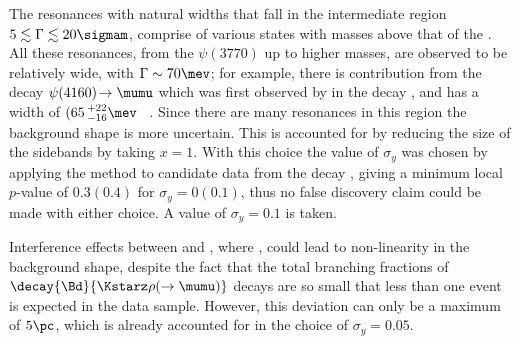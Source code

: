 The resonances with natural widths that fall in the intermediate region
$5\lesssim\Gamma\lesssim20\sigmam$, comprise of various \ccbar states with masses above that of the
\psitwos.
All these resonances, from the $\psi(3770)$ up to higher masses, are observed to be relatively
wide, with $\Gamma\sim 70\mev$; for
example, there is contribution from the decay $\psi(4160)\!\to\mumu$ which was first observed by
\lhcb in the decay \decay{\Bp}{\Kp\mumu},
and has a width of $(65\,^{+22}_{-16}\mev$~\cite{LHCb-PAPER-2013-039} .
Since there are many resonances in this region the background shape is more uncertain.
This is accounted for by reducing the size of the sidebands by taking $x=1$.
With this choice the value of $\sigma_y$ was chosen by applying the method to candidate data from the
decay \decay{\Bp}{\Kp\mumu}, giving a minimum local $p$-value of $0.3(0.4)$ for $\sigma_y=0(0.1)$,
thus no false discovery claim could be made with either choice.
A value of $\sigma_y=0.1$ is taken.






Interference effects between
\btokstrmumu and \decay{\Bd}{\Kstarz\rho}, where \decay{\rho}{\mumu}, could lead to non-linearity
in the background shape, despite the fact that the total branching fractions of
$\decay{\Bd}{\Kstarz\rho(\to\mumu)}$ decays are so small that less than one event is expected in the
data sample.
However, this deviation can only be a maximum of \approx$5\pc$, which is already accounted for in
the choice of $\sigma_y=0.05$.

